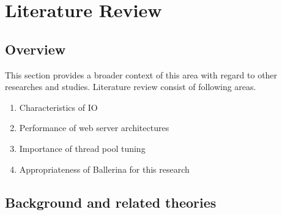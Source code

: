 \chapter{Literature Review}\label{chap:2}

\section{Overview}

This section provides a broader context of this area with regard to other researches and studies. Literature review consist of following areas. 

\begin{enumerate}
	\item Characteristics of IO 
	\item Performance of web server architectures
	\item Importance of thread pool tuning
	\item Appropriateness of Ballerina for this research
	
\end{enumerate}

\section{Background and related theories}

